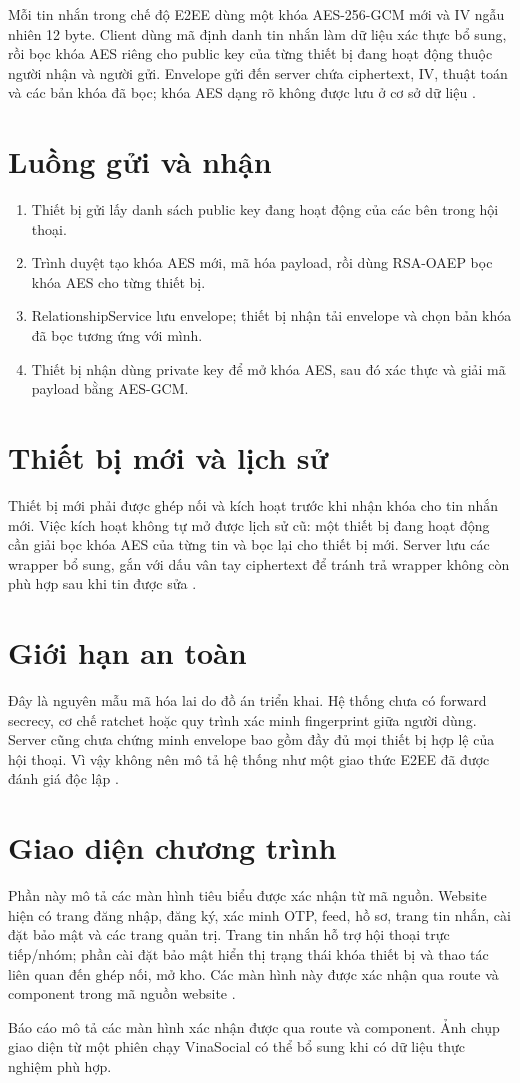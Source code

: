 Mỗi tin nhắn trong chế độ E2EE dùng một khóa AES-256-GCM mới và IV ngẫu nhiên 12 byte. Client dùng mã định danh tin nhắn làm dữ liệu xác thực bổ sung, rồi bọc khóa AES riêng cho public key của từng thiết bị đang hoạt động thuộc người nhận và người gửi. Envelope gửi đến server chứa ciphertext, IV, thuật toán và các bản khóa đã bọc; khóa AES dạng rõ không được lưu ở cơ sở dữ liệu \cite{e2ee}.

\section{Luồng gửi và nhận}
\begin{enumerate}
\item Thiết bị gửi lấy danh sách public key đang hoạt động của các bên trong hội thoại.
\item Trình duyệt tạo khóa AES mới, mã hóa payload, rồi dùng RSA-OAEP bọc khóa AES cho từng thiết bị.
\item RelationshipService lưu envelope; thiết bị nhận tải envelope và chọn bản khóa đã bọc tương ứng với mình.
\item Thiết bị nhận dùng private key để mở khóa AES, sau đó xác thực và giải mã payload bằng AES-GCM.
\end{enumerate}

\section{Thiết bị mới và lịch sử}
Thiết bị mới phải được ghép nối và kích hoạt trước khi nhận khóa cho tin nhắn mới. Việc kích hoạt không tự mở được lịch sử cũ: một thiết bị đang hoạt động cần giải bọc khóa AES của từng tin và bọc lại cho thiết bị mới. Server lưu các wrapper bổ sung, gắn với dấu vân tay ciphertext để tránh trả wrapper không còn phù hợp sau khi tin được sửa \cite{e2ee}.

\section{Giới hạn an toàn}
Đây là nguyên mẫu mã hóa lai do đồ án triển khai. Hệ thống chưa có forward secrecy, cơ chế ratchet hoặc quy trình xác minh fingerprint giữa người dùng. Server cũng chưa chứng minh envelope bao gồm đầy đủ mọi thiết bị hợp lệ của hội thoại. Vì vậy không nên mô tả hệ thống như một giao thức E2EE đã được đánh giá độc lập \cite{relationship,e2ee}.

\section{Giao diện chương trình}
Phần này mô tả các màn hình tiêu biểu được xác nhận từ mã nguồn. Website hiện có trang đăng nhập, đăng ký, xác minh OTP, feed, hồ sơ, trang tin nhắn, cài đặt bảo mật và các trang quản trị. Trang tin nhắn hỗ trợ hội thoại trực tiếp/nhóm; phần cài đặt bảo mật hiển thị trạng thái khóa thiết bị và thao tác liên quan đến ghép nối, mở kho. Các màn hình này được xác nhận qua route và component trong mã nguồn website \cite{usecases,e2ee}.

Báo cáo mô tả các màn hình xác nhận được qua route và component. Ảnh chụp giao diện từ một phiên chạy VinaSocial có thể bổ sung khi có dữ liệu thực nghiệm phù hợp.

